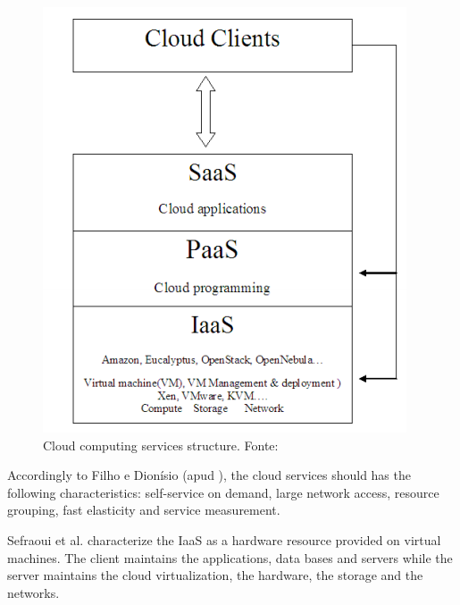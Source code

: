 \documentclass[conference]{IEEEtran}
\begin{document}
\begin{figure}[ht]
\centering
\includegraphics[width=.3\textwidth]{figuras/cloud_structure.png}
\caption{Cloud computing services structure. Fonte: \cite{sefraoui2012openstack}}
\label{fig:cloud_structure}
\end{figure}


Accordingly to Filho e Dionísio \cite{leite2016influencia} (apud \cite{mell2011nist}), the cloud services should has the following 
characteristics: self-service on demand, large network access, resource grouping, fast elasticity and service measurement.


Sefraoui et al. \cite{sefraoui2012openstack} characterize the IaaS as a hardware resource provided on virtual machines. The client
maintains the applications, data bases and servers while the server maintains the cloud virtualization, the hardware, the storage and the networks.   

\end{document}
